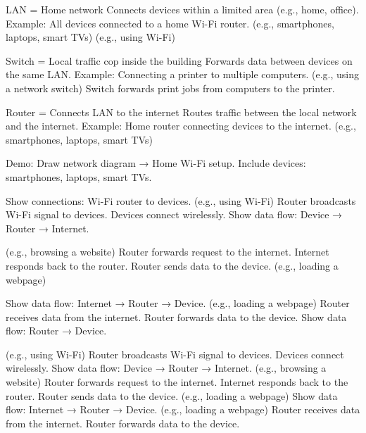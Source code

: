         LAN = Home network
            Connects devices within a limited area (e.g., home, office).
                Example: All devices connected to a home Wi-Fi router.
                (e.g., smartphones, laptops, smart TVs)
                    (e.g., using Wi-Fi)

        Switch = Local traffic cop inside the building
            Forwards data between devices on the same LAN.
                Example: Connecting a printer to multiple computers.
                    (e.g., using a network switch)
                        Switch forwards print jobs from computers to the printer.


        Router = Connects LAN to the internet
            Routes traffic between the local network and the internet.
                Example: Home router connecting devices to the internet.
                    (e.g., smartphones, laptops, smart TVs)


        Demo: Draw network diagram → Home Wi-Fi setup.
            Include devices: smartphones, laptops, smart TVs.

            Show connections: Wi-Fi router to devices.
                (e.g., using Wi-Fi)
                    Router broadcasts Wi-Fi signal to devices.
                    Devices connect wirelessly.
                    Show data flow: Device → Router → Internet.

                    (e.g., browsing a website)
                        Router forwards request to the internet.
                        Internet responds back to the router.
                        Router sends data to the device.
                            (e.g., loading a webpage)

                            Show data flow: Internet → Router → Device.
                                (e.g., loading a webpage)
                                    Router receives data from the internet.
                                    Router forwards data to the device.
                                    Show data flow: Router → Device.

                            (e.g., using Wi-Fi)
                                Router broadcasts Wi-Fi signal to devices.
                                Devices connect wirelessly.
                                Show data flow: Device → Router → Internet.
                                (e.g., browsing a website)
                                    Router forwards request to the internet.
                                    Internet responds back to the router.
                                    Router sends data to the device.
                                        (e.g., loading a webpage)
                                        Show data flow: Internet → Router → Device.
                                            (e.g., loading a webpage)
                                                Router receives data from the internet.
                                                Router forwards data to the device.
                

